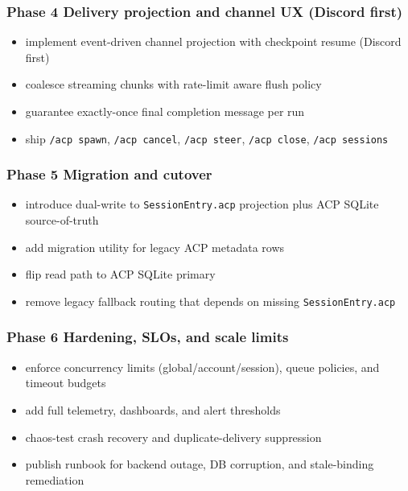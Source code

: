 \subsubsection{Phase 4 Delivery projection and channel UX (Discord first)}


\begin{itemize}
  \item implement event-driven channel projection with checkpoint resume (Discord first)
  \item coalesce streaming chunks with rate-limit aware flush policy
  \item guarantee exactly-once final completion message per run
  \item ship \texttt{/acp spawn}, \texttt{/acp cancel}, \texttt{/acp steer}, \texttt{/acp close}, \texttt{/acp sessions}
\end{itemize}


\subsubsection{Phase 5 Migration and cutover}


\begin{itemize}
  \item introduce dual-write to \texttt{SessionEntry.acp} projection plus ACP SQLite source-of-truth
  \item add migration utility for legacy ACP metadata rows
  \item flip read path to ACP SQLite primary
  \item remove legacy fallback routing that depends on missing \texttt{SessionEntry.acp}
\end{itemize}


\subsubsection{Phase 6 Hardening, SLOs, and scale limits}


\begin{itemize}
  \item enforce concurrency limits (global/account/session), queue policies, and timeout budgets
  \item add full telemetry, dashboards, and alert thresholds
  \item chaos-test crash recovery and duplicate-delivery suppression
  \item publish runbook for backend outage, DB corruption, and stale-binding remediation
\end{itemize}


